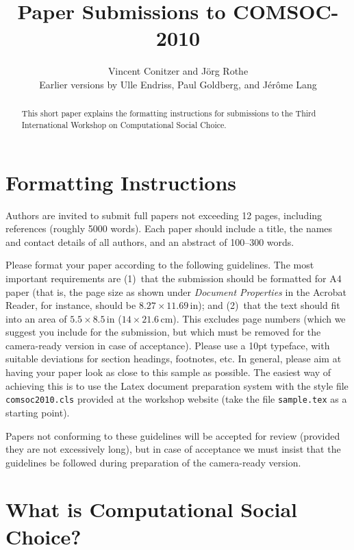 \documentclass{comsoc2010}
\title{Paper Submissions to COMSOC-2010}
\author{Vincent Conitzer and J\"org Rothe\\
\footnotesize{Earlier versions by Ulle Endriss, Paul Goldberg, and J\'er\^ome Lang}}
\begin{document}

\begin{abstract}
This short paper explains the formatting instructions for submissions
to the Third International Workshop on Computational Social Choice.
\end{abstract}


\section{Formatting Instructions}

Authors are invited to submit full papers not exceeding 12 pages, 
including references (roughly 5000 words). Each paper should include 
a title, the names and contact details of all authors, and an abstract 
of 100--300 words.

Please format your paper according to the following guidelines.
The most important requirements are (1)~that the submission should be 
formatted for A4 paper (that is, the page size as shown under 
\emph{Document Properties} in the Acrobat Reader, for instance, should 
be $8.27\times 11.69\,\mbox{in}$); and (2)~that the text should fit into 
an area of $5.5\times 8.5\,\mbox{in}$ ($14\times 21.6\,\mbox{cm}$). 
This excludes page numbers (which we suggest you include for the 
submission, but which must be removed for the camera-ready version in 
case of acceptance). Please use a 10pt typeface, with suitable deviations
for section headings, footnotes, etc. In general, please aim at having 
your paper look as close to this sample as possible. The easiest way of 
achieving this is to use the Latex document preparation system with the 
style file \texttt{comsoc2010.cls} provided at the workshop  website 
(take the file \texttt{sample.tex} as a starting point).

Papers not conforming to these guidelines will be accepted for review
(provided they are not excessively long), but in case of acceptance we
must insist that the guidelines be followed during preparation of the 
camera-ready version.  


\section{What is Computational Social Choice?}
\end{document}

